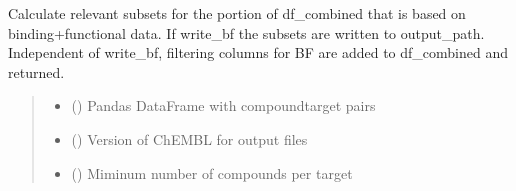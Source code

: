 \documentclass[letterpaper,10pt,english]{sphinxmanual}
\begin{document}
\begin{fulllineitems}
\label{\detokenize{write_subsets:write_subsets.write_bf_to_file}}
\pysigstartsignatures
{}
\pysigstopsignatures
\sphinxAtStartPar
Calculate relevant subsets for the portion of df\_combined
that is based on binding+functional data.
If write\_bf the subsets are written to output\_path.
Independent of write\_bf, filtering columns for BF are added to df\_combined and returned.
\begin{quote}\begin{description}
\begin{itemize}
\item {} 
\sphinxAtStartPar
{} () \textendash{} Pandas DataFrame with compound\sphinxhyphen{}target pairs

\item {} 
\sphinxAtStartPar
{} () \textendash{} Version of ChEMBL for output files

\item {} 
\sphinxAtStartPar
{} () \textendash{} Miminum number of compounds per target


\end{itemize}
\end{description}
\end{quote}
\end{fulllineitems}
\end{document}
